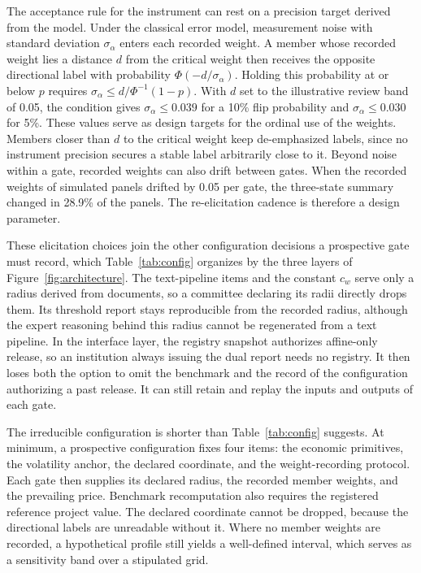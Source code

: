\documentclass[5p,times,authoryear]{elsarticle}
\theoremstyle{plain}
\begin{document}
The acceptance rule for the instrument can rest on a precision target derived from the model. Under the classical error model, measurement noise with standard deviation $\sigma_{\alpha}$ enters each recorded weight. A member whose recorded weight lies a distance $d$ from the critical weight then receives the opposite directional label with probability $\Phi(-d/\sigma_{\alpha})$. Holding this probability at or below $p$ requires $\sigma_{\alpha}\le d/\Phi^{-1}(1-p)$. With $d$ set to the illustrative review band of 0.05, the condition gives $\sigma_{\alpha}\le0.039$ for a 10\% flip probability and $\sigma_{\alpha}\le0.030$ for 5\%. These values serve as design targets for the ordinal use of the weights. Members closer than $d$ to the critical weight keep de-emphasized labels, since no instrument precision secures a stable label arbitrarily close to it. Beyond noise within a gate, recorded weights can also drift between gates. When the recorded weights of simulated panels drifted by 0.05 per gate, the three-state summary changed in 28.9\% of the panels. The re-elicitation cadence is therefore a design parameter.

These elicitation choices join the other configuration decisions a prospective gate must record, which Table~\ref{tab:config} organizes by the three layers of Figure~\ref{fig:architecture}. The text-pipeline items and the constant $c_w$ serve only a radius derived from documents, so a committee declaring its radii directly drops them. Its threshold report stays reproducible from the recorded radius, although the expert reasoning behind this radius cannot be regenerated from a text pipeline. In the interface layer, the registry snapshot authorizes affine-only release, so an institution always issuing the dual report needs no registry. It then loses both the option to omit the benchmark and the record of the configuration authorizing a past release. It can still retain and replay the inputs and outputs of each gate.

The irreducible configuration is shorter than Table~\ref{tab:config} suggests. At minimum, a prospective configuration fixes four items: the economic primitives, the volatility anchor, the declared coordinate, and the weight-recording protocol. Each gate then supplies its declared radius, the recorded member weights, and the prevailing price. Benchmark recomputation also requires the registered reference project value. The declared coordinate cannot be dropped, because the directional labels are unreadable without it. Where no member weights are recorded, a hypothetical profile still yields a well-defined interval, which serves as a sensitivity band over a stipulated grid.
\end{document}
